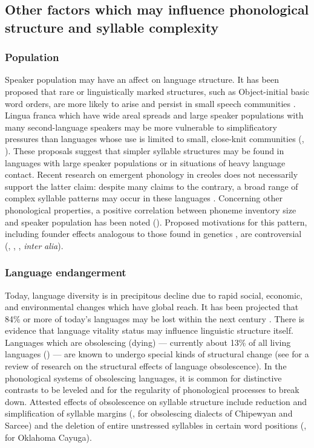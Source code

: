 \subsection{Other factors which may influence phonological structure and syllable complexity}\label{sec:2.1.2}
\subsubsection{{Population}}\label{sec:2.1.2.1}

  Speaker population may have an affect on language structure. It has been proposed that rare or linguistically marked structures, such as Object-initial basic word orders, are more likely to arise and persist in small speech communities \citep{Nettle1999a}. Lingua franca which have wide areal spreads and large speaker populations with many second-language speakers may be more vulnerable to simplificatory pressures than languages whose use is limited to small, close-knit communities (\citealt{Nettle1999b}, \citealt{LupyanDale2010}). These proposals suggest that simpler syllable structures may be found in languages with large speaker populations or in situations of heavy language contact. Recent research on emergent phonology in creoles does not necessarily support the latter claim: despite many claims to the contrary, a broad range of complex syllable patterns may occur in these languages \citep{Schramm2014}. Concerning other phonological properties, a positive correlation between phoneme inventory size and speaker population has been noted (\citealt{HayBauer2007}). Proposed motivations for this pattern, including founder effects analogous to those found in genetics \citep{Atkinson2011}, are controversial (\citealt{Bybee2011}, \citealt{MaddiesonEtAl2011}, \citealt{HunleyEtAl2012}, \textit{inter} \textit{alia}).

\subsubsection{{Language} {endangerment}}\label{sec:2.1.2.2}

  Today, language diversity is in precipitous decline due to rapid social, economic, and environmental changes which have global reach. It has been projected that 84\% or more of today’s languages may be lost within the next century \citep[113-114]{Nettle1999b}. There is evidence that language vitality status may influence linguistic structure itself. Languages which are obsolescing (dying) — currently about 13\% of all living languages (\citealt{SimonsFennig2018}) — are known to undergo special kinds of structural change (see \citealt{Romaine2010} for a review of research on the structural effects of language obsolescence). In the phonological systems of obsolescing languages, it is common for distinctive contrasts to be leveled and for the regularity of phonological processes to break down. Attested effects of obsolescence on syllable structure include reduction and simplification of syllable margins (\citealt{Cook1989}, for obsolescing dialects of Chipewyan and Sarcee) and the deletion of entire unstressed syllables in certain word positions (\citealt{Mithun1989}, for Oklahoma Cayuga).

